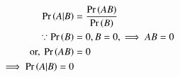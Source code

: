 \begin{align}
\Pr\left(A|B\right) &= \frac{\Pr\left(AB\right)}{\Pr\left(B\right)}
\\
\because \Pr\left(B\right) &= 0, B = 0, \implies AB = 0
\\
\text{or, } \Pr\left(AB\right) &= 0
\\
 \implies \Pr\left(A|B\right) = 0
\end{align}
